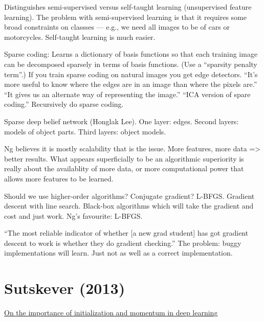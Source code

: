 \documentclass[12pt]{report}
\newcommand{\link}[2]{\href{#1}{#2}}
\begin{document}
Distinguishes semi-supervised versus self-taught learning
(unsupervised feature learning).  The problem with semi-supervised
learning is that it requires some broad constraints on classses ---
e.g., we need all images to be of cars or motorcycles.  Self-taught
learning is much easier.

Sparse coding: Learns a dictionary of basis functions so that each
training image can be decomposed sparsely in terms of basis functions.
(Use a ``sparsity penalty term''.)  If you train sparse coding on
natural images you get edge detectors.  ``It's more useful to know
where the edges are in an image than where the pixels are.''  ``It
gives us an alternate way of representing the image.''  ``ICA version
of spare coding.''  Recursively do sparse coding.

Sparse deep belief network (Honglak Lee).  One layer: edges.  Second
layers: models of object parts.  Third layers: object models.  

Ng believes it is mostly scalability that is the issue.  More
features, more data => better results.  What appears superficially to
be an algorithmic superiority is really about the availablity of more
data, or more computational power that allows more features to be
learned.

Should we use higher-order algorithms?  Conjugate gradient?  L-BFGS.
Gradient descent with line search.  Black-box algorithms which will
take the gradient and cost and just work.  Ng's favourite: L-BFGS.

``The most reliable indicator of whether [a new grad student] has got
gradient descent to work is whether they do gradient checking.''  The
problem: buggy implementations will learn.  Just not as well as a
correct implementation.

\section{Sutskever (2013)}

\link{http://www.cs.utoronto.ca/\~ilya/pubs/2013/1051_2.pdf}{On the
  importance of initialization and momentum in deep learning}
\end{document}
